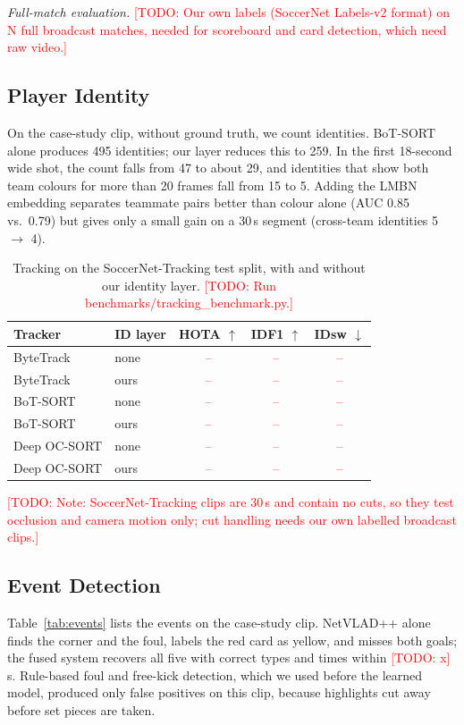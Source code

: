 \documentclass[conference]{IEEEtran}
\newcommand{\todo}[1]{\textcolor{red}{[TODO: #1]}}
\newcommand{\tbd}{\textcolor{red}{--}}
\begin{document}
\textit{Full-match evaluation.} \todo{Our own labels (SoccerNet Labels-v2 format) on N full broadcast matches, needed for scoreboard and card detection, which need raw video.}

\subsection{Player Identity}
On the case-study clip, without ground truth, we count identities. BoT-SORT alone produces 495 identities; our layer reduces this to 259. In the first 18-second wide shot, the count falls from 47 to about 29, and identities that show both team colours for more than 20 frames fall from 15 to 5. Adding the LMBN embedding separates teammate pairs better than colour alone (AUC 0.85 vs.\ 0.79) but gives only a small gain on a 30\,s segment (cross-team identities 5 $\rightarrow$ 4).

\begin{table}[t]
\centering
\caption{Tracking on the SoccerNet-Tracking test split, with and without our identity layer. \todo{Run benchmarks/tracking\_benchmark.py.}}
\label{tab:tracking}
\begin{tabular}{llccc}
\toprule
Tracker & ID layer & HOTA $\uparrow$ & IDF1 $\uparrow$ & IDsw $\downarrow$ \\
\midrule
ByteTrack \cite{zhang2022bytetrack} & none & \tbd & \tbd & \tbd \\
ByteTrack & ours & \tbd & \tbd & \tbd \\
BoT-SORT \cite{aharon2022botsort} & none & \tbd & \tbd & \tbd \\
BoT-SORT & ours & \tbd & \tbd & \tbd \\
Deep OC-SORT & none & \tbd & \tbd & \tbd \\
Deep OC-SORT & ours & \tbd & \tbd & \tbd \\
\bottomrule
\end{tabular}
\end{table}

\todo{Note: SoccerNet-Tracking clips are 30\,s and contain no cuts, so they test occlusion and camera motion only; cut handling needs our own labelled broadcast clips.}

\subsection{Event Detection}

Table~\ref{tab:events} lists the events on the case-study clip. NetVLAD++ alone finds the corner and the foul, labels the red card as yellow, and misses both goals; the fused system recovers all five with correct types and times within \todo{x}\,s. Rule-based foul and free-kick detection, which we used before the learned model, produced only false positives on this clip, because highlights cut away before set pieces are taken.
\end{document}
